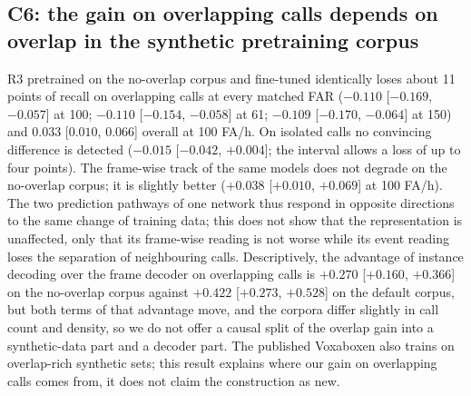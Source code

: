 \documentclass[10pt,twocolumn]{article}
\begin{document}
\subsection{C6: the gain on overlapping calls depends on overlap in the synthetic pretraining corpus}
\label{sec:noov}
R3 pretrained on the no-overlap corpus and fine-tuned identically loses about 11 points of recall on overlapping calls at every matched FAR ($-0.110$ [$-0.169$, $-0.057$] at 100; $-0.110$ [$-0.154$, $-0.058$] at 61; $-0.109$ [$-0.170$, $-0.064$] at 150) and $0.033$ [$0.010$, $0.066$] overall at 100 FA/h. On isolated calls no convincing difference is detected ($-0.015$ [$-0.042$, $+0.004$]; the interval allows a loss of up to four points). The frame-wise track of the same models does not degrade on the no-overlap corpus; it is slightly better ($+0.038$ [$+0.010$, $+0.069$] at 100 FA/h). The two prediction pathways of one network thus respond in opposite directions to the same change of training data; this does not show that the representation is unaffected, only that its frame-wise reading is not worse while its event reading loses the separation of neighbouring calls. Descriptively, the advantage of instance decoding over the frame decoder on overlapping calls is $+0.270$ [$+0.160$, $+0.366$] on the no-overlap corpus against $+0.422$ [$+0.273$, $+0.528$] on the default corpus, but both terms of that advantage move, and the corpora differ slightly in call count and density, so we do not offer a causal split of the overlap gain into a synthetic-data part and a decoder part. The published Voxaboxen also trains on overlap-rich synthetic sets; this result explains where our gain on overlapping calls comes from, it does not claim the construction as new.
\end{document}
